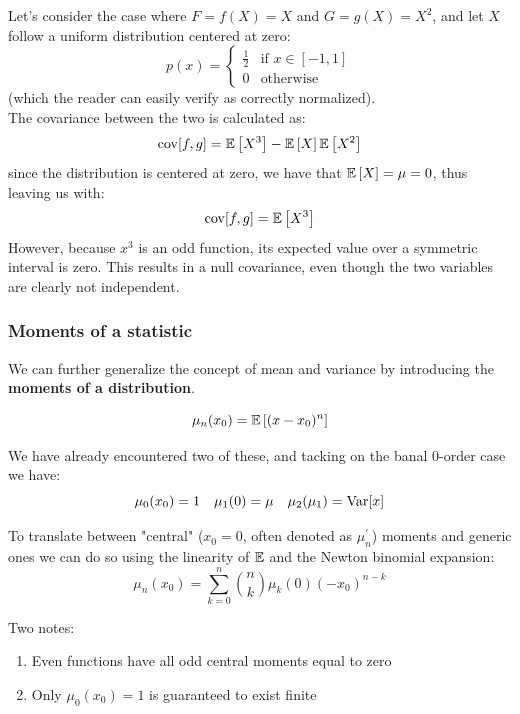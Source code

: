 \begin{example}
Let's consider the case where $F=f(X)=X$ and $G=g(X)=X^2$, and let $X$ follow a uniform distribution centered at zero:
	\[
	p(x) = \begin{cases} \frac{1}{2} & \text{if } x \in [-1,1] \\ 0 &  \text{otherwise} \end{cases}
	\]
(which the reader can easily verify as correctly normalized).\\
The covariance between the two is calculated as:
	\[
	\operatorname{cov}[f,g]=\mathbb{E}\left[X^3\right]-\mathbb{E}\left[X\right]\mathbb{E}\left[X^2\right]
	\]
since the distribution is centered at zero, we have that $\mathbb{E}\left[X\right]=\mu=0$, thus leaving us with:
	\[
	\operatorname{cov}[f,g]=\mathbb{E}\left[X^3\right]
	\]
However, because $x^3$ is an odd function, its expected value over a symmetric interval is zero. This results in a null covariance, even though the two variables are clearly not independent.
\end{example}

\subsubsection{Moments of a statistic}
\label{subsec:moments}
We can further generalize the concept of mean and variance by introducing the \textbf{moments of a distribution}.
\begin{definition}
	\[
	\mu_n(x_0) = \mathbb{E}\left[ (x-x_0)^n\right]
	\]
\end{definition}

We have already encountered two of these, and tacking on the banal $0$-order case we have:
	\[
	\mu_0(x_0) = 1 \quad \mu_1(0) = \mu \quad \mu_2(\mu_1) = \operatorname{Var}[x]
	\]

To translate between "central" ($x_0=0$, often denoted as $\mu_n^\prime$) moments and generic ones we can do so using the linearity of $\mathbb{E}$ and the Newton binomial expansion: 
	\[
	\mu_n(x_0) = \sum_{k=0}^n \binom{n}{k} \mu_k(0)(-x_0)^{n-k}
	\]

Two notes: 
\begin{enumerate}
	\item Even functions have all odd central moments equal to zero
	\item Only $\mu_0(x_0) = 1$ is guaranteed to exist finite
\end{enumerate}


